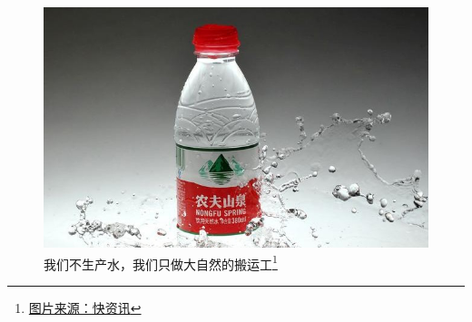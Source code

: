





\createtitle

\begin{frame}
    \begin{figure}[!tb]
        \includegraphics[width=\onepicwidth]{figure/water}
        \caption{我们不生产水，我们只做大自然的搬运工\footnote{
                 \href{http://sh.qihoo.com/pc/967ac7a2370f8fc79?sign=360_e39369d1}{图片来源：快资讯}}}
    \end{figure}
\end{frame}

\createoutline



\createlastpage


